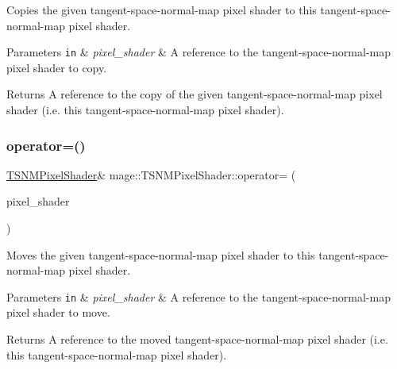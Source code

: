 Copies the given tangent-\/space-\/normal-\/map pixel shader to this tangent-\/space-\/normal-\/map pixel shader.


\begin{DoxyParams}[1]{Parameters}
\mbox{\tt in}  & {\em pixel\+\_\+shader} & A reference to the tangent-\/space-\/normal-\/map pixel shader to copy. \\
\hline
\end{DoxyParams}
\begin{DoxyReturn}{Returns}
A reference to the copy of the given tangent-\/space-\/normal-\/map pixel shader (i.\+e. this tangent-\/space-\/normal-\/map pixel shader). 
\end{DoxyReturn}
\hypertarget{classmage_1_1_t_s_n_m_pixel_shader_a0d714c73017f9bb9b273b2d2a276ab5f}{}\label{classmage_1_1_t_s_n_m_pixel_shader_a0d714c73017f9bb9b273b2d2a276ab5f} 
\subsubsection{\texorpdfstring{operator=()}{operator=()}\hspace{0.1cm}{\footnotesize\ttfamily [2/2]}}
{\footnotesize\ttfamily \hyperlink{classmage_1_1_t_s_n_m_pixel_shader}{T\+S\+N\+M\+Pixel\+Shader}\& mage\+::\+T\+S\+N\+M\+Pixel\+Shader\+::operator= (\begin{DoxyParamCaption}\item[{\hyperlink{classmage_1_1_t_s_n_m_pixel_shader}{T\+S\+N\+M\+Pixel\+Shader} \&\&}]{pixel\+\_\+shader }\end{DoxyParamCaption})\hspace{0.3cm}{\ttfamily [delete]}}

Moves the given tangent-\/space-\/normal-\/map pixel shader to this tangent-\/space-\/normal-\/map pixel shader.


\begin{DoxyParams}[1]{Parameters}
\mbox{\tt in}  & {\em pixel\+\_\+shader} & A reference to the tangent-\/space-\/normal-\/map pixel shader to move. \\
\hline
\end{DoxyParams}
\begin{DoxyReturn}{Returns}
A reference to the moved tangent-\/space-\/normal-\/map pixel shader (i.\+e. this tangent-\/space-\/normal-\/map pixel shader). 
\end{DoxyReturn}
\hypertarget{classmage_1_1_t_s_n_m_pixel_shader_a9b9f44b0cf757061e1c29388c9b20c38}{}\label{classmage_1_1_t_s_n_m_pixel_shader_a9b9f44b0cf757061e1c29388c9b20c38} 

